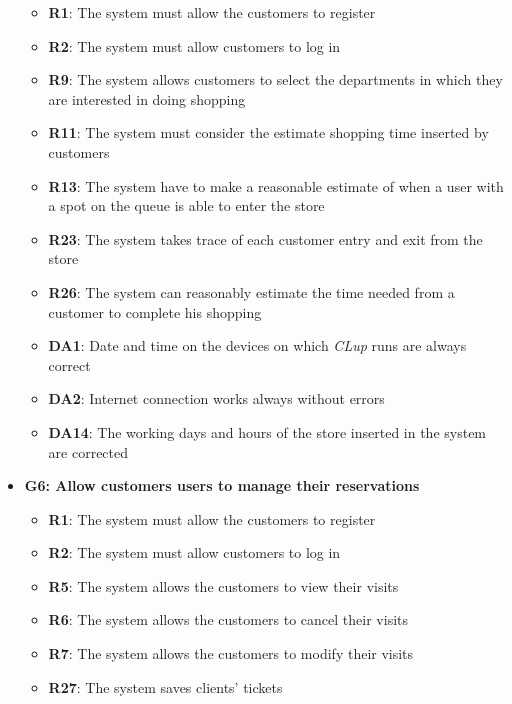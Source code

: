 \documentclass{article}
\begin{document}
\begin{itemize}
					\begin{itemize}
						
						\item {\bfseries R1}: The system must allow the customers to register
						\item {\bfseries R2}: The system must allow customers to log in
						\item {\bfseries R9}: The system allows customers to select the departments in which they are interested in doing shopping
						\item {\bfseries R11}: The system must consider the estimate shopping time inserted by customers
						\item {\bfseries R13}: The system have to make a reasonable estimate of when a user with a spot on the queue is able to enter the store
						\item {\bfseries R23}: The system takes trace of each customer entry and exit from the store
						\item {\bfseries R26}: The system can reasonably estimate the time needed from a customer to complete his shopping \\
						
						\item {\bfseries DA1}: Date and time on the devices on which \emph{CLup} runs are always correct
						\item {\bfseries DA2}: Internet connection works always without errors
						\item {\bfseries DA14}: The working days and hours of the store inserted in the system are corrected
						
					\end{itemize}

				\item {\bfseries G6: Allow customers users to manage their reservations}	

					\begin{itemize}
						\item {\bfseries R1}: The system must allow the customers to register
						\item {\bfseries R2}: The system must allow customers to log in
						\item {\bfseries R5}: The system allows the customers to view their visits
						\item {\bfseries R6}: The system allows the customers to cancel their visits
						\item {\bfseries R7}: The system allows the customers to modify their visits
						\item {\bfseries R27}: The system saves clients' tickets \\
		

\end{itemize}
\end{itemize}
\end{document}
